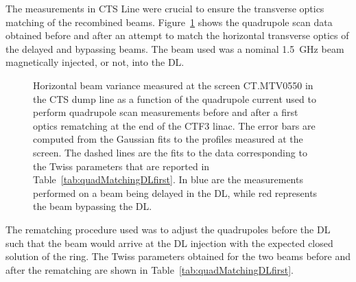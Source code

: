 The measurements in CTS Line were crucial to
ensure the transverse optics matching of the recombined beams.
Figure~\ref{fig:trasverseDLmatchingAttempt} shows the quadrupole scan  data obtained before and after
an attempt to match the horizontal transverse optics of the delayed and bypassing beams.
The beam used was a nominal 1.5~GHz beam magnetically injected, or not, into the DL. 
%
\begin{figure}[htbp]
\centering
{}
\qquad
{}
\caption{Horizontal beam variance measured at the screen CT.MTV0550 in the CTS dump line as a function
         of the quadrupole current used to perform quadrupole scan measurements before
         \protect{} and after
         \protect{} a first optics rematching at the end of
         the CTF3 linac.
         The error bars are computed from the Gaussian fits to the profiles measured at the screen.
         The dashed lines are the fits to the data corresponding to the Twiss parameters that are
         reported in Table~\ref{tab:quadMatchingDLfirst}.
         In blue are the measurements performed on a beam being delayed in the DL, while red
         represents the beam bypassing the DL.
}
\label{fig:trasverseDLmatchingAttempt}
\end{figure}
%
The rematching procedure used was to adjust the quadrupoles before the DL such that the beam would
arrive at the DL injection with the expected closed solution of the ring.
The Twiss parameters obtained for the two beams before and after the rematching are shown in
Table~\ref{tab:quadMatchingDLfirst}.
%
